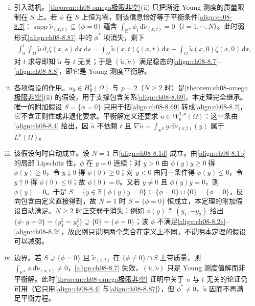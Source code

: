 \documentclass[../../main.tex]{subfiles}%
\begin{document}
\begin{remark}\label{remark:ch08-平衡解}
\begin{enumerate}[(i)]
\item 引入动机。\cref{theorem:ch08-omega极限非空}(ii) 只把渐近 Young 测度的质量限制在 $S$ 上。若 $\phi$ 在 $S$ 上恒为零，则该信息恰好等于平衡条件\eqref{align:ch08-8.7}：$\operatorname{supp}\tilde\nu_{(x,t)}\subseteq\{\phi=0\}$ 蕴含 $\int_{\mathbb{R}^N}\phi_i\,\mathrm{d}\tilde\nu_{(x,t)}=0$（$i=1,\cdots ,N$）。此时弱形式\eqref{align:ch08-8.87} 中的 $\phi^*$ 项消失，剩下
\begin{align*}
\int_0^t\int_\Omega\tilde u\,\partial_s\zeta(x,s)\,\mathrm{d}x\,\mathrm{d}s
=\int_\Omega\tilde u(x,t)\zeta(x,t)\,\mathrm{d}x-\int_\Omega\tilde u(x,0)\zeta(x,0)\,\mathrm{d}x,
\end{align*}
对 $t$ 求导即知 $\tilde u$ 与 $t$ 无关；于是 $(\tilde u,\tilde\nu)$ 满足稳态的\eqref{align:ch08-8.7}--\eqref{align:ch08-8.8}，即它是 Young 测度平衡解。
\item 各项假设的作用。$u_0\in H^1_0(\Omega)$ 与 $p=2$（$N\geqslant2$ 时）是\cref{theorem:ch08-omega极限非空}(ii) 的假设，用于支撑包含关系\eqref{align:ch08-8.69}，本定理完全继承。唯一的附加假设 $S=\{\phi=0\}$ 只用于把\eqref{align:ch08-8.69} 转成\eqref{align:ch08-8.7}，它不含正则性或非退化要求。平衡解定义还要求 $\bar u\in W^{1,p}_0(\Omega)$：这一条由\eqref{align:ch08-8.4} 给出，因 $\tilde u$ 不依赖 $t$ 且 $\nabla\tilde u=\int_{\mathbb{R}^N}y\,\mathrm{d}\tilde\nu_{(x,t)}(y)$ 属于 $L^p(\Omega)$。
\item 该假设何时自动成立。设 $N=1$ 且\eqref{align:ch08-8.1d} 成立。由\eqref{align:ch08-8.1b} 的局部 Lipschitz 性，$\phi$ 在 $y=0$ 连续：对 $y>0$ 由 $\phi(y)y\geqslant0$ 得 $\phi(y)\geqslant0$，令 $y\downarrow0$ 得 $\phi(0)\geqslant0$；对 $y<0$ 由同一条件得 $\phi(y)\leqslant0$，令 $y\uparrow0$ 得 $\phi(0)\leqslant0$；故 $\phi(0)=0$。又若 $y\neq0$ 且 $\phi(y)y=0$，则 $\phi(y)=0$。于是 $S=\{y\in\mathbb{R}\mid\phi(y)y=0\}\subseteq\{\phi=0\}\cup\{0\}=\{\phi=0\}$，反向包含由定义直接得到，故 $N=1$ 时 $S=\{\phi=0\}$ 恒成立，本定理的附加假设自动满足。$N\geqslant2$ 时正交弱于消失：例如 $\phi(y)\triangleq(y_1,-y_2)$ 给出 $\{\phi\cdot y=0\}=\{y_1^2=y_2^2\}\supsetneq\{0\}=\{\phi=0\}$；该 $\phi$ 不满足\eqref{align:ch08-8.2e}--\eqref{align:ch08-8.2f}，故此例只说明两个集合在定义上不同，不说明本定理的假设可以减弱。
\item 边界。若 $S\supsetneq\{\phi=0\}$ 且 $\tilde\nu_{(x,t)}$ 在 $\{\phi\neq0\}\cap S$ 上带质量，则 $\int_{\mathbb{R}^N}\phi\,\mathrm{d}\tilde\nu_{(x,t)}\neq0$，\eqref{align:ch08-8.7} 失效，$(\tilde u,\tilde\nu)$ 只是 Young 测度值解而非平衡解。此时\cref{theorem:ch08-omega极限非空} 证明中关于 $\tilde u$ 与 $t$ 无关的论证仍可用（它只用\eqref{align:ch08-8.4} 与\eqref{align:ch08-8.87}），但 $\phi^*\neq0$，$\tilde u$ 因而不再满足平衡方程。
\end{enumerate}
\end{remark}
\end{document}
